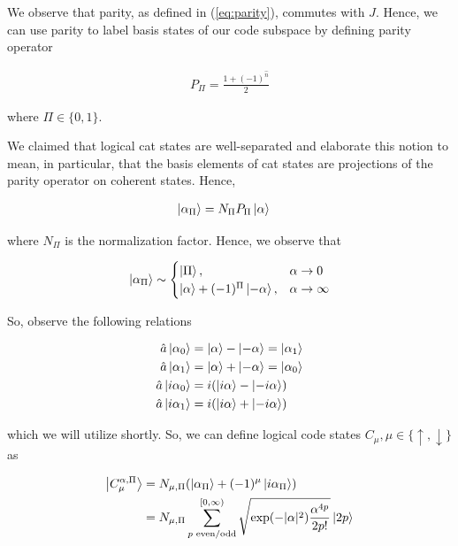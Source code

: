 \documentclass[12]{amsart}
\newcommand\0{\mathbf{0}}
\newcommand\<{\langle}
\renewcommand\>{\rangle}
\begin{document}
We observe that parity, as defined in (\ref{eq:parity}), commutes with $J$. Hence, we can use parity to label basis states of our code subspace by defining parity operator

\begin{align*}
P_{\Pi} = \frac{1+(-1)^{\hat{n}}}{2}	
\end{align*}

where $\Pi \in \{0, 1\}$.

We claimed that logical cat states are well-separated and elaborate this notion to mean, in particular, that the basis elements of cat states are projections of the parity operator on coherent states. Hence,

\begin{align*}
\ket{\alpha_\Pi} &= N_\Pi P_\Pi \ket{\alpha}
\end{align*}

where $N_\Pi$ is the normalization factor. Hence, we observe that

\begin{align*}
\ket{\alpha_\Pi} \sim \begin{cases} \ket{\Pi},  &\alpha \rightarrow 0\\ \ket{\alpha} + (-1)^\Pi \ket{-\alpha}, &\alpha \rightarrow \infty \end{cases}
\end{align*}

So, observe the following relations

\begin{align}
\label{eq:cat-rels}
\begin{split}
\hat{a} \ket{\alpha_0} &= \ket{\alpha} - \ket{-\alpha} = \ket{\alpha_1} \\
\hat{a} \ket{\alpha_1} &= \ket{\alpha} + \ket{-\alpha} = \ket{\alpha_0} \\
\hat{a} \ket{i\alpha_0} &= i(\ket{i\alpha} - \ket{-i\alpha})\\
\hat{a} \ket{i\alpha_1} &= i(\ket{i\alpha}  + \ket{-i\alpha})
\end{split}
\end{align}

which we will utilize shortly. So, we can define logical code states $C_\mu, \mu \in \{ \uparrow, \downarrow \}$ as 

\begin{align*}
\ket{C_\mu^{\alpha, \Pi}} &= N_{\mu, \Pi} (\ket{\alpha_\Pi} + (-1)^\mu \ket{i \alpha_\Pi})\\
&= N_{\mu, \Pi} \sum_{p\text{ even/odd}}^{[0, \infty)}\sqrt{\exp(-|\alpha|^2)\frac{
\alpha^{4p}}{2p!}}\ket{2p}
\end{align*}
\end{document}
